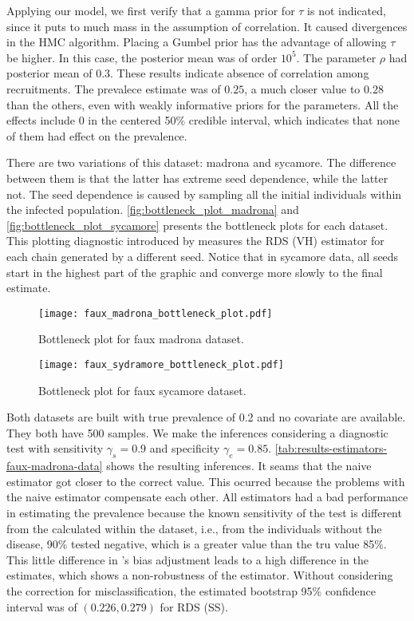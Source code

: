 Applying our model, we first verify that a gamma prior for $\tau$ is not
indicated, since it puts to much mass in the assumption of correlation. It
caused divergences in the HMC algorithm. Placing a Gumbel prior has the
advantage of allowing $\tau$ be higher. In this case, the posterior mean was
of order $10^{5}$. The parameter $\rho$ had posterior mean of $0.3$. These
results indicate absence of correlation among recruitments. The prevalece
estimate was of $0.25$, a much closer value to $0.28$ than the others, even
with weakly informative priors for the parameters. All the effects include 0
in the centered 50\% credible interval, which indicates that none of them
had effect on the prevalence.

There are two variations of this dataset: madrona and sycamore. The difference
between them is that the latter has extreme seed dependence, while the latter
not. The seed dependence is caused by sampling all the initial individuals
within the infected population. \autoref{fig:bottleneck_plot_madrona} and
\autoref{fig:bottleneck_plot_sycamore} presents the bottleneck plots for each
dataset. This plotting diagnostic introduced by \textcite{gile2015diagnostics}
measures the RDS (VH) estimator for each chain generated by a different seed.
Notice that in sycamore data, all seeds start in the highest part of the graphic
and converge more slowly to the final estimate. 

\begin{figure}
    \centering
    \caption{\label{fig:bottleneck_plot_madrona}Bottleneck plot for faux
    madrona dataset.}
    \texttt{[image: faux\_madrona\_bottleneck\_plot.pdf]}
\end{figure}

\begin{figure}
    \centering
    \caption{\label{fig:bottleneck_plot_sycamore}Bottleneck plot for faux
    sycamore dataset.}
    \texttt{[image: faux\_sydramore\_bottleneck\_plot.pdf]}
\end{figure}

Both datasets are built with true prevalence of 0.2 and no covariate are
available. They both have 500 samples. We make the
inferences considering a diagnostic test with sensitivity $\gamma_s = 0.9$ 
and specificity $\gamma_e = 0.85$.
\autoref{tab:results-estimators-faux-madrona-data} shows the resulting
inferences. It seams that the naive estimator got closer to the correct value.
This ocurred because the problems with the naive estimator compensate each
other. All estimators had a bad performance in estimating the prevalence
because the known sensitivity of the test is different from the calculated
within the dataset, i.e., from the individuals without the disease, 90\%
tested negative, which is a greater value than the tru value 85\%. This little difference in
\textcite{rogan1978estimating}'s bias adjustment leads to a high difference in
the estimates, which shows a non-robustness of the estimator. Without considering the
correction for misclassification, the estimated bootstrap 95\% confidence interval was
of $(0.226, 0.279)$ for RDS (SS). 

